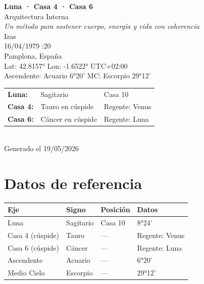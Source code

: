 \documentclass[11pt,a4paper]{article}
\begin{document}
\begin{titlepage}
  \centering
  \vspace*{1.5cm}
  {\Huge\bfseries\color{azulai} Luna · Casa 4 · Casa 6}\\[0.5cm]
  {\large\color{grisai} Arquitectura Interna}\\[0.3cm]
  {\small\itshape\color{grisai} Un método para sostener cuerpo, energía y vida con coherencia}\\[2cm]
  {\huge\color{doradoai} Izas}\\[1.5cm]
  {\Large 16/04/1979 :20}\\[0.3cm]
  {\Large Pamplona, España}\\[0.3cm]
  {\normalsize Lat: 42.8157° \quad Lon: -1.6522° \quad UTC+02:00}\\[0.3cm]
  {\normalsize Ascendente: Acuario 6°20' \quad
    MC: Escorpio 29°12'}\\[2cm]

  \begin{tabular}{lll}
    \textbf{Luna:} & Sagitario & Casa 10 \\
    \textbf{Casa 4:} & Tauro en cúspide & Regente: Venus \\
    \textbf{Casa 6:} & Cáncer en cúspide & Regente: Luna \\
  \end{tabular}\\[2cm]

  \vfill
  {\small Generado el 19/05/2026}
\end{titlepage}

\tableofcontents
\clearpage

\section{Datos de referencia}

\begin{center}
\begin{tabular}{llll}
  \toprule
  \textbf{Eje} & \textbf{Signo} & \textbf{Posición} & \textbf{Datos} \\
  \midrule
  Luna & Sagitario & Casa 10 & 8°24' \\
  Casa 4 (cúspide) & Tauro & --- & Regente: Venus \\
  Casa 6 (cúspide) & Cáncer & --- & Regente: Luna \\
  Ascendente & Acuario & --- & 6°20' \\
  Medio Cielo & Escorpio & --- & 29°12' \\
  \bottomrule
\end{tabular}
\end{center}
\end{document}
